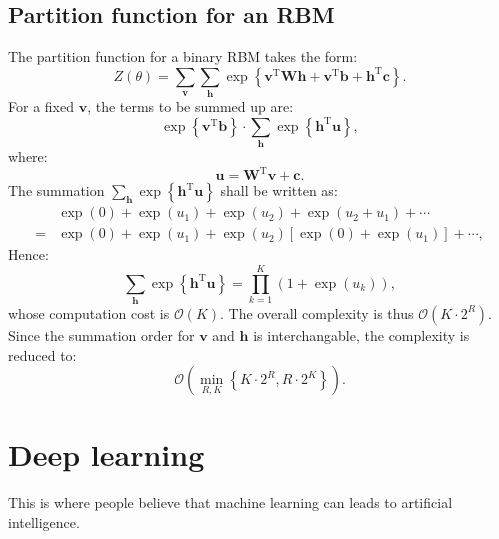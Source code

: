 \documentclass[UTF8]{ctexart}
\begin{document}
\subsection{Partition function for an RBM}
The partition function for a binary RBM takes the form:
$$Z(\theta)=\sum_{\textbf{v}}\sum_{\textbf{h}}\exp\left\{\textbf{v}^{\text{T}}\textbf{W}\textbf{h}+\textbf{v}^{\text{T}}\textbf{b}+\textbf{h}^{\text{T}}\textbf{c} \right\}.$$
For a fixed $\textbf{v}$, the terms to be summed up are:
$$\exp\left\{\textbf{v}^{\text{T}}\textbf{b} \right\}\cdot \sum_{\textbf{h}}\exp\left\{\textbf{h}^{\text{T}}\textbf{u} \right\},$$
where:
$$\textbf{u}=\textbf{W}^{\text{T}}\textbf{v}+\textbf{c}.$$
The summation  $\sum_{\textbf{h}}\exp\left\{\textbf{h}^{\text{T}}\textbf{u} \right\}$ shall be written as:
$$
\begin{aligned}
&\exp(0)+\exp(u_{1})+\exp(u_{2})+\exp(u_{2}+u_{1})+\cdots\\
=&\exp(0)+\exp(u_{1})+\exp(u_{2})[\exp(0)+\exp(u_{1})]+\cdots,
\end{aligned}
$$
Hence:
$$\sum_{\textbf{h}}\exp\left\{\textbf{h}^{\text{T}}\textbf{u} \right\}=\prod_{k=1}^{K}(1+\exp(u_{k})),$$
whose computation cost is $\mathcal{O}(K)$.
The overall complexity is thus $\mathcal{O}(K\cdot 2^{R})$.
Since the summation order for $\textbf{v}$ and $\textbf{h}$ is interchangable, the complexity is reduced to:
$$\mathcal{O}\left(\min_{R,K}\left\{K\cdot 2^{R},R\cdot 2^{K} \right\}\right).$$

\newpage
\section{Deep learning}
This is where people believe that machine learning can leads to artificial intelligence. 
\end{document}
